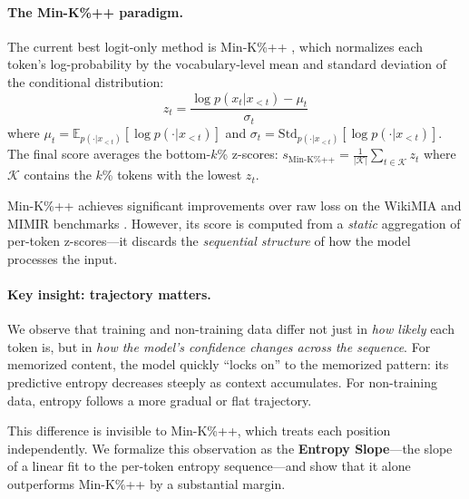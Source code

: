 \documentclass[11pt]{article}
\newcommand{\minkpp}{\text{Min-K\%++}}
\begin{document}
\paragraph{The Min-K\%++ paradigm.}
The current best logit-only method is Min-K\%++ \citep{zhang2024minkpp}, which normalizes each token's log-probability by the vocabulary-level mean and standard deviation of the conditional distribution:
\begin{equation}
    z_t = \frac{\log p(x_t | x_{<t}) - \mu_t}{\sigma_t}
    \label{eq:minkpp}
\end{equation}
where $\mu_t = \mathbb{E}_{p(\cdot|x_{<t})}[\log p(\cdot|x_{<t})]$ and $\sigma_t = \text{Std}_{p(\cdot|x_{<t})}[\log p(\cdot|x_{<t})]$.
The final score averages the bottom-$k$\% z-scores: $s_{\minkpp{}} = \frac{1}{|\mathcal{K}|}\sum_{t \in \mathcal{K}} z_t$ where $\mathcal{K}$ contains the $k$\% tokens with the lowest $z_t$.

Min-K\%++ achieves significant improvements over raw loss on the WikiMIA and MIMIR benchmarks \citep{shi2024detecting, duan2024membership}.
However, its score is computed from a \textit{static} aggregation of per-token z-scores---it discards the \textit{sequential structure} of how the model processes the input.

\paragraph{Key insight: trajectory matters.}
We observe that training and non-training data differ not just in \textit{how likely} each token is, but in \textit{how the model's confidence changes across the sequence}.
For memorized content, the model quickly ``locks on'' to the memorized pattern: its predictive entropy decreases steeply as context accumulates.
For non-training data, entropy follows a more gradual or flat trajectory.

This difference is invisible to Min-K\%++, which treats each position independently.
We formalize this observation as the \textbf{Entropy Slope}---the slope of a linear fit to the per-token entropy sequence---and show that it alone outperforms Min-K\%++ by a substantial margin.
\end{document}

